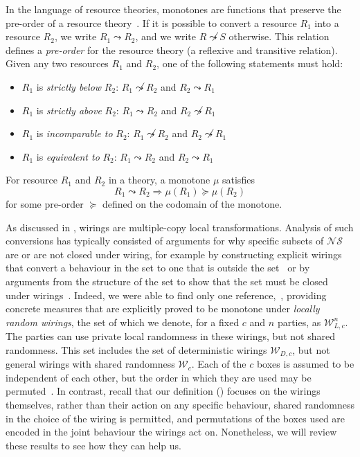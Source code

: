 \documentclass[10pt, a4paper]{article}
\numberwithin{equation}{section} %
\theoremstyle{definition}
\theoremstyle{plain}
\newcommand{\?}{\mathrel{?}} %
\newcommand{\sW}{\mathcal{W}}
\newcommand{\NSs}{\mathcal{NS}}
\begin{document}
                        In the language of resource theories, monotones are functions that preserve the pre-order of a resource theory~\cite{NonclassicalCausation}. If it is possible to convert a resource \(R_1\) into a resource \(R_2\), we write \(R_1 \leadsto R_2\), and we write \(R \not\leadsto S\) otherwise. This relation defines a \emph{pre-order} for the resource theory (a reflexive and transitive relation). Given any two resources \(R_1\) and \(R_2\), one of the following statements must hold:
                        \begin{itemize}
                          \item \(R_1\) is \emph{strictly below} \(R_2\): \(R_1 \not\leadsto R_2\) and \(R_2 \leadsto R_1\)
                          \item \(R_1\) is \emph{strictly above} \(R_2\): \(R_1 \leadsto R_2\) and \(R_2 \not\leadsto R_1\)
                          \item \(R_1\) is \emph{incomparable to} \(R_2\): \(R_1 \not\leadsto R_2\) and \(R_2 \not\leadsto R_1\)
                          \item \(R_1\) is \emph{equivalent to} \(R_2\): \(R_1 \leadsto R_2\) and \(R_2 \leadsto R_1\)
                        \end{itemize}

                        For resource \(R_1\) and \(R_2\) in a theory, a monotone \(\mu\) satisfies
                        \begin{equation}
                          R_1 \leadsto R_2 \Rightarrow \mu(R_1) \succeq \mu(R_2)
                        \end{equation}
                        for some pre-order \(\succeq\) defined on the codomain of the monotone.

                        As discussed in , wirings are multiple-copy local transformations. Analysis of such conversions has typically consisted of arguments for why specific subsets of \(\NSs\) are or are not closed under wiring, for example by constructing explicit wirings that convert a behaviour in the set to one that is outside the set~\cite{ClosedCorrSets} or by arguments from the structure of the set to show that the set must be closed under wirings~\cite{NonlocalZoo}. Indeed, we were able to find only one reference,~\cite{NLMonotones}, providing concrete measures that are explicitly proved to be monotone under \emph{locally random wirings}, the set of which we denote, for a fixed \(c\) and \(n\) parties, as \(\sW_{L,c}^n\). The parties can use private local randomness in these wirings, but not shared randomness. This set includes the set of deterministic wirings \(\sW_{D,c}\), but not general wirings with shared randomness \(\sW_c\). Each of the \(c\) boxes is assumed to be independent of each other, but the order in which they are used may be permuted~\cite[Sec. 3]{NLMonotones}. In contrast, recall that our definition () focuses on the wirings themselves, rather than their action on any specific behaviour, shared randomness in the choice of the wiring is permitted, and permutations of the boxes used are encoded in the joint behaviour the wirings act on. Nonetheless, we will review these results to see how they can help us.
\end{document}
